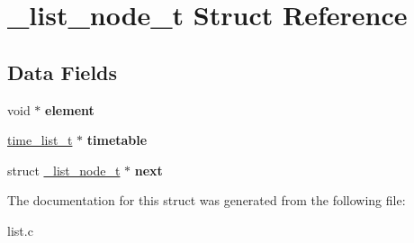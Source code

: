 \hypertarget{struct__list__node__t}{}\section{\+\_\+list\+\_\+node\+\_\+t Struct Reference}
\label{struct__list__node__t}
\subsection*{Data Fields}
\begin{DoxyCompactItemize}
\item 
\hypertarget{struct__list__node__t_abea5f5c0727c725b8f3b21f14b45abf1}{}void $\ast$ {\bfseries element}\label{struct__list__node__t_abea5f5c0727c725b8f3b21f14b45abf1}

\item 
\hypertarget{struct__list__node__t_a3174391dd8d5a3160cb497afecf4253a}{}\hyperlink{struct__time__list__t}{time\+\_\+list\+\_\+t} $\ast$ {\bfseries timetable}\label{struct__list__node__t_a3174391dd8d5a3160cb497afecf4253a}

\item 
\hypertarget{struct__list__node__t_a7e892551dbe86f632a09818435bdb459}{}struct \hyperlink{struct__list__node__t}{\+\_\+list\+\_\+node\+\_\+t} $\ast$ {\bfseries next}\label{struct__list__node__t_a7e892551dbe86f632a09818435bdb459}

\end{DoxyCompactItemize}


The documentation for this struct was generated from the following file\+:\begin{DoxyCompactItemize}
\item 
list.\+c\end{DoxyCompactItemize}
